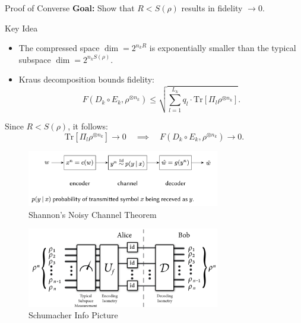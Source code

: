 \begin{frame}{Proof of Converse}
    \textbf{Goal:} Show that \( R < S(\rho) \) results in fidelity \( \to 0 \).
    \begin{block}{Key Idea}
        \begin{itemize}
            \item The compressed space \( \dim = 2^{n_k R} \) is exponentially smaller than the typical subspace \( \dim = 2^{n_k S(\rho)} \).
            \item Kraus decomposition bounds fidelity:
            \[
            F(D_k \circ E_k, \rho^{\otimes n_k}) \leq \sqrt{\sum_{l=1}^{L_k} q_l \cdot \text{Tr}[\Pi_l \rho^{\otimes n_k}]}.
            \]
        \end{itemize}
    \end{block}
    Since \( R < S(\rho) \), it follows:
    \[
    \text{Tr}[\Pi_l \rho^{\otimes n_k}] \to 0 \quad \implies \quad F(D_k \circ E_k, \rho^{\otimes n_k}) \to 0.
    \]
\end{frame}

\begin{figure}[h]
    \centering
    \includegraphics[width=0.75\textwidth]{figures/shannon_pic.png}
    \caption{Shannon's Noisy Channel Theorem \cite{jahooShannonsNoisy}}
\end{figure}

\begin{figure}[h]
    \centering
    \includegraphics[width=0.75\textwidth]{figures/schumacher.png}
    \caption{Schumacher Info Picture \cite{PhysRevA.51.2738}}
\end{figure}
